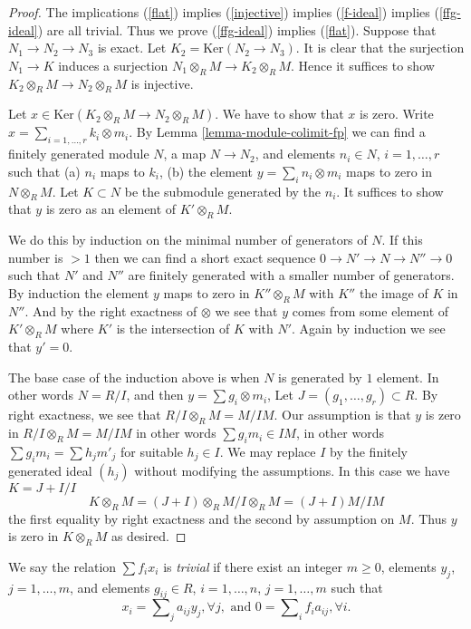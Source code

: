 \begin{proof}
The implications (\ref{flat}) implies (\ref{injective})
implies (\ref{f-ideal}) implies (\ref{ffg-ideal}) are all
trivial. Thus we prove (\ref{ffg-ideal}) implies (\ref{flat}).
Suppose that $N_1 \to N_2 \to N_3$ is exact.
Let $K_2 = \text{Ker}(N_2 \to N_3)$. 
It is clear that the surjection $N_1 \to K$
induces a surjection $N_1 \otimes_R M \to K_2\otimes_R M$.
Hence it suffices to show $K_2\otimes_R M \to N_2\otimes_R M$
is injective.

\medskip\noindent
Let $x \in \text{Ker}(K_2\otimes_R M \to N_2\otimes_R M)$.
We have to show that $x$ is zero.
Write $x = \sum_{i=1,\ldots,r} k_i \otimes m_i$. By
Lemma \ref{lemma-module-colimit-fp}
we can find a finitely generated module $N$,
a map $N \to N_2$, and elements $n_i \in N$, $i=1,\ldots,r$ such that
(a) $n_i$ maps to $k_i$, (b) the element $y = \sum_i n_i \otimes m_i$
maps to zero in $N \otimes_R M$. Let $K \subset N$
be the submodule generated by the $n_i$. It suffices to show that
$y$ is zero as an element of $K' \otimes_R M$.

\medskip\noindent
We do this by induction on the minimal number of generators of
$N$. If this number is $>1$ then we can find a short exact
sequence
$0 \to N' \to N \to N''\to 0$
such that $N'$ and $N''$ are finitely generated with a smaller
number of generators. By induction the element $y$ maps
to zero in $K'' \otimes_R M$ with $K''$ the image of $K$
in $N''$. And by the right exactness of $\otimes$ we see
that $y$ comes from some element of $K' \otimes_R M$
where $K'$ is the intersection of $K$ with $N'$. Again
by induction we see that $y' = 0$.

\medskip\noindent
The base case of the induction above is when
$N$ is generated by $1$ element. In other words
$N = R/I$, and then $y = \sum g_i \otimes m_i$,
Let $J = (g_1,\ldots,g_r) \subset R$.
By right exactness, we see that $R/I \otimes_R M
= M/IM$. Our assumption is that $y$ is zero
in $R/I \otimes_R M = M/IM$ in other words
$\sum g_im_i \in IM$, in other words
$\sum g_im_i = \sum h_j m'_j$ for suitable
$h_j \in I$. We may replace $I$ by the finitely
generated ideal $(h_j)$ without modifying the assumptions.
In this case we have $K = J+I/I$
$$
K\otimes_R M
=
(J+I)\otimes_R M /I\otimes_R M
=
(J+I)M / IM
$$
the first equality by right exactness
and the second by assumption on $M$.
Thus $y$ is zero in $K\otimes_RM$ as desired.
\end{proof}

\noindent
We say the relation $\sum f_i x_i$
is {\it trivial} if there exist an integer $m \geq 0$,
elements $y_j$, $j=1,\ldots, m$, and elements $g_{ij} \in R$,
$i=1,\ldots,n$, $j=1,\ldots,m$ such that
$$
x_i = \sum\nolimits_j a_{ij} y_j, \forall j,
\text{ and }
0 = \sum\nolimits_i f_ia_{ij}, \forall i.
$$

